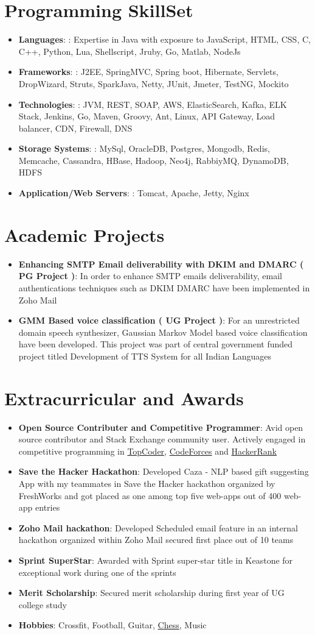 \documentclass[letterpaper,11pt]{article}
\newcommand{\resumeItem}[2]{
  \item\small{
    \textbf{#1}{: #2 \vspace{-2pt}}
  }
}
\newcommand{\resumeSubItem}[2]{\resumeItem{#1}{#2}\vspace{-4pt}}
\newcommand{\resumeSubHeadingListStart}{\begin{itemize}[leftmargin=*]}
\newcommand{\resumeSubHeadingListEnd}{\end{itemize}}
\begin{document}
\section{Programming SkillSet}
  \resumeSubHeadingListStart
    \resumeSubItem{Languages}{: Expertise in Java with exposure to JavaScript, HTML, CSS, C, C++, Python, Lua, Shellscript, Jruby, Go, Matlab, NodeJs}
    \resumeSubItem{Frameworks}{: J2EE, SpringMVC, Spring boot, Hibernate, Servlets, DropWizard, Struts, SparkJava, Netty, JUnit, Jmeter, TestNG, Mockito}
    \resumeSubItem{Technologies}{: JVM, REST, SOAP, AWS, ElasticSearch, Kafka, ELK Stack, Jenkins, Go, Maven, Groovy, Ant, Linux, API Gateway, Load balancer, CDN, Firewall, DNS}
    \resumeSubItem{Storage Systems}{: MySql, OracleDB, Postgres, Mongodb, Redis, Memcache,  Cassandra, HBase, Hadoop, Neo4j, RabbiyMQ, DynamoDB, HDFS}
     \resumeSubItem{Application/Web Servers}{: Tomcat, Apache, Jetty, Nginx}
     
  \resumeSubHeadingListEnd


\section{Academic Projects}
  \resumeSubHeadingListStart
    \resumeSubItem{Enhancing SMTP Email deliverability with DKIM and DMARC ( PG Project )}
      {In order to enhance SMTP
emails deliverability, email authentications techniques such as DKIM DMARC have been implemented in Zoho Mail}
    \resumeSubItem{GMM Based voice classification ( UG Project )}
      {For an unrestricted domain speech synthesizer, Gaussian Markov
Model based voice classification have been developed. This project was part of central government funded project titled
Development of TTS System for all Indian Languages}


  \resumeSubHeadingListEnd


\section{Extracurricular and Awards}
  \resumeSubHeadingListStart
    \resumeSubItem{Open Source Contributer and Competitive Programmer}
      {Avid open source contributor and Stack Exchange community user. Actively engaged in competitive programming in \href{}{TopCoder}, \href{}{CodeForces} and \href{}{HackerRank}}
    \resumeSubItem{Save the Hacker Hackathon}
      {Developed Caza - NLP based gift suggesting App with my teammates in Save the
Hacker hackathon organized by FreshWorks and got placed as one among top five web-apps out of 400 web-app entries}
    \resumeSubItem{Zoho Mail hackathon}
      {Developed Scheduled email feature in an internal hackathon organized within Zoho Mail secured first place out of 10 teams}
    \resumeSubItem{Sprint SuperStar}
      {Awarded with Sprint super-star title in Keastone for exceptional work during one of the sprints}
    \resumeSubItem{Merit Scholarship}
      {Secured merit scholarship during first year of UG college study}
      \resumeSubItem{Hobbies}
      {Crossfit, Football, Guitar, {\href{https://www.chess.com/member/aarish24}{Chess}}, Music}
  \resumeSubHeadingListEnd

\end{document}
